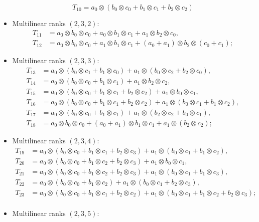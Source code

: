 \begin{itemize}
\[
T_{10} = a_0 \otimes (b_0 \otimes c_0 + b_1 \otimes c_1 + b_2 \otimes c_2)
\]
\item Multilinear ranks $(2,3,2)$:
\begin{align*}
T_{11} &= a_0 \otimes b_0 \otimes c_0 + a_0 \otimes b_1 \otimes c_1 + a_1 \otimes b_2 \otimes c_0, \\
T_{12} &= a_0 \otimes b_0 \otimes c_0 + a_1 \otimes b_1 \otimes c_1 + (a_0 + a_1) \otimes b_2 \otimes (c_0 + c_1);
\end{align*}
\item Multilinear ranks $(2,3,3)$:
\begin{align*}
T_{13} &= a_0 \otimes (b_0 \otimes c_1 + b_1 \otimes c_0) + a_1 \otimes (b_0 \otimes c_2 + b_2 \otimes c_0), \\
T_{14} &= a_0 \otimes (b_0 \otimes c_0 +  b_1 \otimes c_1) + a_1 \otimes b_2 \otimes c_2,\\
T_{15} &= a_0 \otimes (b_0 \otimes c_0 +  b_1 \otimes c_1 + b_2 \otimes c_2) + a_1 \otimes b_0 \otimes c_1,\\
T_{16} &= a_0 \otimes (b_0 \otimes c_0 +  b_1 \otimes c_1 + b_2 \otimes c_2) + a_1 \otimes (b_0 \otimes c_1 + b_1 \otimes c_2),\\
T_{17} &= a_0 \otimes (b_0 \otimes c_0 +  b_1 \otimes c_1) + a_1 \otimes (b_2 \otimes c_2 + b_0 \otimes c_1 ),\\
T_{18} &= a_0 \otimes b_0 \otimes c_0 +  (a_0+a_1) \otimes b_1 \otimes c_1 + a_1 \otimes (b_2 \otimes c_2);
\end{align*}
\item Multilinear ranks $(2,3,4)$:
\begin{align*}
T_{19} &= a_0 \otimes (b_0 \otimes c_0 + b_1 \otimes c_1 + b_2 \otimes c_3) + a_1 \otimes (b_0 \otimes c_1 + b_1 \otimes c_2), \\
T_{20} &= a_0 \otimes (b_0 \otimes c_0 +  b_1 \otimes c_2 + b_2 \otimes c_3) + a_1 \otimes b_0 \otimes c_1,\\
T_{21} &= a_0 \otimes (b_0 \otimes c_0 +  b_1 \otimes c_2 + b_2 \otimes c_3) + a_1 \otimes (b_0 \otimes c_1 +b_1 \otimes c_3),\\
T_{22} &= a_0 \otimes (b_0 \otimes c_0 +  b_1 \otimes c_2) + a_1 \otimes (b_0 \otimes c_1 +b_2 \otimes c_3),\\
T_{23} &= a_0 \otimes (b_0 \otimes c_0 +  b_1 \otimes c_1 + b_2 \otimes c_2) + a_1 \otimes (b_0 \otimes c_1 + b_1 \otimes c_2 + b_2 \otimes c_3);\\
\end{align*}
\item Multilinear ranks $(2,3,5)$:

\end{itemize}
